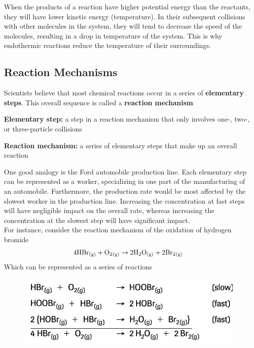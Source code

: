 \begin{important}
    When the products of a reaction have higher potential energy than the reactants, they will
    have lower kinetic energy (temperature). In their subsequent collisions with other molecules
    in the system, they will tend to decrease the speed of the molecules, resulting in a drop
    in temperature of the system. This is why endothermic reactions reduce the temperature of
    their surroundings.
\end{important}

\subsection{Reaction Mechanisms}
\begin{bulleted-list}
    \item Scientists believe that most chemical reactions occur in a series of \textbf{elementary
        steps}. This overall sequence is called a \textbf{reaction mechanism}
    \item \textbf{Elementary step:} a step in a reaction mechanism that only involves one-, two-,
        or three-particle collisions
    \item \textbf{Reaction mechanism:} a series of elementary steps that make up an overall reaction
\end{bulleted-list}
One good analogy is the Ford automobile production line. Each elementary step can be represented
as a worker, specializing in one part of the manufacturing of an automobile. Furthermore, the
production rate would be most affected by the slowest worker in the production line. Increasing
the concentration at fast steps will have negligible impact on the overall rate, whereas increasing
the concentration at the slowest step will have significant impact.\\

For instance, consider the reaction mechanism of the oxidation of hydrogen bromide
\[
    4 \ch{HBr_{(g)}}+\ch{O2_{(g)}}\to 2\ch{H2O_{(g)}}+2 \ch{Br2_{(g)}}
\]
Which can be represented as a series of reactions
\begin{figure}[ht!]
    \centering
    \includegraphics[width=0.5 \textwidth]{../figures/oxidation-of-hydrogen-bromide-reaction-intermediates.png}
\end{figure}

